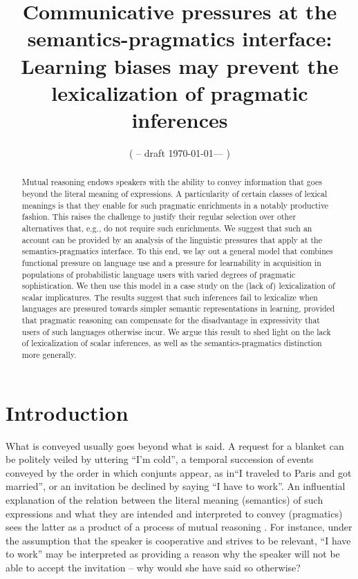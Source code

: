 \documentclass[a4paper]{article}
\title{Communicative pressures at the semantics-pragmatics interface:\\ Learning biases may prevent the lexicalization of pragmatic inferences}
\author{%
    ( -- draft \today --- )
}
\date{}
\begin{document}
\maketitle

\begin{abstract} 
Mutual reasoning endows speakers with the ability to convey information that goes beyond the literal meaning of expressions. A particularity of certain classes of lexical meanings is that they enable for such pragmatic enrichments in a notably productive fashion. This raises the challenge to justify their regular selection over other alternatives that, e.g., do not require such enrichments. We suggest that such an account can be provided by an analysis of the linguistic pressures that apply at the semantics-pragmatics interface. To this end, we lay out a general model that combines functional pressure on language use and a pressure for learnability in acquisition in populations of probabilistic language users with varied degrees of pragmatic sophistication. We then use this model in a case study on the (lack of) lexicalization of scalar implicatures. The results suggest that such inferences fail to lexicalize when languages are pressured towards simpler semantic representations in learning, provided that pragmatic reasoning can compensate for the disadvantage in expressivity that users of such languages otherwise incur. We argue this result to shed light on the lack of lexicalization of scalar inferences, as well as the semantics-pragmatics distinction more generally.
\end{abstract}

\section{Introduction}\label{sec:introduction}
What is conveyed usually goes beyond what is said. A request for a blanket can be politely veiled by uttering ``I'm cold'', a temporal succession of events conveyed by the order in which conjunts appear, as in``I traveled to Paris and got married'', or an invitation be declined by saying ``I have to work''. An influential explanation of the relation between the literal meaning (semantics) of such expressions and what they are intended and interpreted to convey (pragmatics) sees the latter as a product of a process of mutual reasoning \citep{grice:1975}. For instance, under the assumption that the speaker is cooperative and strives to be relevant, ``I have to work'' may be interpreted as providing a reason why the speaker will not be able to accept the invitation -- why would she have said so otherwise?
\end{document}
